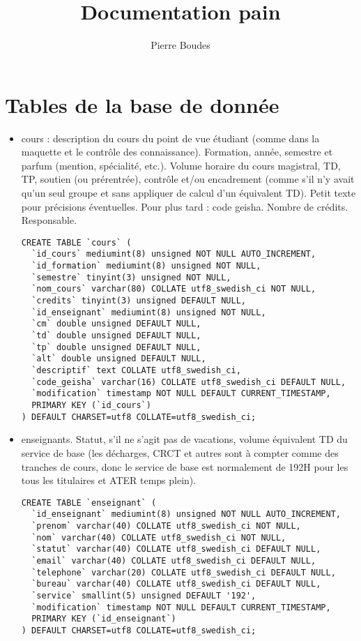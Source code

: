 \documentclass{article}
\begin{document}
\title{Documentation pain}
\author{Pierre Boudes}

\section{Tables de la base de donnée}

\begin{itemize}
\item cours : description du cours du point de vue étudiant (comme dans la maquette et le contrôle des connaissance). Formation, année, semestre et parfum (mention, spécialité, etc.). Volume horaire du cours magistral, TD, TP, soutien (ou prérentrée), contrôle et/ou encadrement  (comme s'il n'y avait qu'un seul groupe et sans appliquer de calcul d'un équivalent TD). Petit texte pour précisions éventuelles. Pour plus tard : code geisha. Nombre de crédits. Responsable.
\begin{verbatim}
CREATE TABLE `cours` (
  `id_cours` mediumint(8) unsigned NOT NULL AUTO_INCREMENT,
  `id_formation` mediumint(8) unsigned NOT NULL,
  `semestre` tinyint(3) unsigned NOT NULL,
  `nom_cours` varchar(80) COLLATE utf8_swedish_ci NOT NULL,
  `credits` tinyint(3) unsigned DEFAULT NULL,
  `id_enseignant` mediumint(8) unsigned NOT NULL,
  `cm` double unsigned DEFAULT NULL,
  `td` double unsigned DEFAULT NULL,
  `tp` double unsigned DEFAULT NULL,
  `alt` double unsigned DEFAULT NULL,
  `descriptif` text COLLATE utf8_swedish_ci,
  `code_geisha` varchar(16) COLLATE utf8_swedish_ci DEFAULT NULL,
  `modification` timestamp NOT NULL DEFAULT CURRENT_TIMESTAMP,
  PRIMARY KEY (`id_cours`)
) DEFAULT CHARSET=utf8 COLLATE=utf8_swedish_ci;
\end{verbatim}
\item enseignants. Statut, s'il ne s'agit pas de vacations, volume équivalent TD du service de base (les décharges, CRCT et autres sont à compter comme des tranches de cours, donc le service de base est normalement de 192H pour les tous les titulaires et ATER temps plein). 
\begin{verbatim}
CREATE TABLE `enseignant` (
  `id_enseignant` mediumint(8) unsigned NOT NULL AUTO_INCREMENT,
  `prenom` varchar(40) COLLATE utf8_swedish_ci NOT NULL,
  `nom` varchar(40) COLLATE utf8_swedish_ci NOT NULL,
  `statut` varchar(40) COLLATE utf8_swedish_ci DEFAULT NULL,
  `email` varchar(40) COLLATE utf8_swedish_ci DEFAULT NULL,
  `telephone` varchar(20) COLLATE utf8_swedish_ci DEFAULT NULL,
  `bureau` varchar(40) COLLATE utf8_swedish_ci DEFAULT NULL,
  `service` smallint(5) unsigned DEFAULT '192',
  `modification` timestamp NOT NULL DEFAULT CURRENT_TIMESTAMP,
  PRIMARY KEY (`id_enseignant`)
) DEFAULT CHARSET=utf8 COLLATE=utf8_swedish_ci;


\end{verbatim}
\end{itemize}
\end{document}
